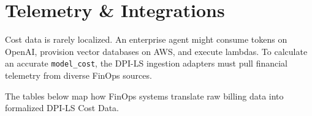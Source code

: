 \documentclass[11pt,a4paper]{article}
\begin{document}
\newpage

\section{Telemetry \& Integrations}

Cost data is rarely localized. An enterprise agent might consume tokens on OpenAI, provision vector databases on AWS, and execute lambdas. To calculate an accurate \texttt{model\_cost}, the DPI-LS ingestion adapters must pull financial telemetry from diverse FinOps sources.

The tables below map how FinOps systems translate raw billing data into formalized DPI-LS Cost Data.
\end{document}
